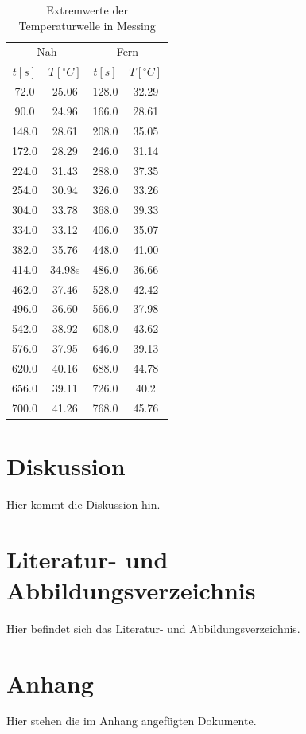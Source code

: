 \documentclass[11pt]{article}
\begin{document}
\begin{table}
\centering
\label{messing_extr}

\begin{tabular}{c|c||c|c|}
\multicolumn{2}{c||}{Nah} & \multicolumn{2}{c}{Fern}\\
$t[s]$ & $T[^\circ C]$ & $t[s]$ & $T[^\circ C]$ \\
\hline
\hline
72.0 & 25.06 & 128.0 & 32.29\\
90.0 & 24.96 & 166.0 & 28.61\\
148.0 & 28.61 & 208.0 & 35.05\\
172.0 & 28.29 & 246.0 & 31.14\\
224.0 & 31.43 & 288.0 & 37.35\\
254.0 & 30.94 & 326.0 & 33.26\\
304.0 & 33.78 & 368.0 & 39.33\\
334.0 & 33.12 & 406.0 & 35.07\\
382.0 & 35.76 & 448.0 & 41.00\\
414.0 & 34.98s & 486.0 & 36.66\\
462.0 & 37.46 & 528.0 & 42.42\\
496.0 & 36.60 & 566.0 & 37.98\\
542.0 & 38.92 & 608.0 & 43.62\\
576.0 & 37.95 & 646.0 & 39.13\\
620.0 & 40.16 & 688.0 & 44.78\\
656.0 & 39.11 & 726.0 & 40.2\\
700.0 & 41.26 & 768.0 & 45.76\\
\hline
\end{tabular}
\caption{Extremwerte der Temperaturwelle in Messing}
\end{table}
\section{Diskussion}
Hier kommt die Diskussion hin.
\section{Literatur- und Abbildungsverzeichnis}
Hier befindet sich das Literatur- und Abbildungsverzeichnis.
\section{Anhang}
Hier stehen die im Anhang angefügten Dokumente.
\end{document}
